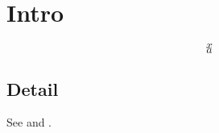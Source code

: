 \documentclass[twocolumn,unicode]{wrapper}
\begin{document}
\wrapperclass\articleclass\layoutmode\hypermode
\section{Intro}\label{sec:intro}
\begin{equation}x\end{equation}
\begin{equation}\label{eq:first}a\end{equation}
\subsection{Detail}\label{sub:detail}
See  and .
\end{document}
